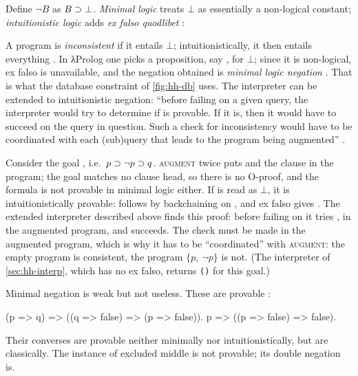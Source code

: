 {{Define $\neg B$ as $B\supset\bot$. \emph{Minimal logic} treats $\bot$ as essentially a non-logical constant;
\emph{intuitionistic logic} adds \emph{ex falso quodlibet} :
\begin{mathpar}
\end{mathpar}
A program is \emph{inconsistent} if it entails $\bot$; intuitionistically, it then entails everything
. In λProlog one picks a proposition, say , for $\bot$; since it is non-logical, ex falso
is unavailable, and the negation obtained is \emph{minimal logic negation} . That is what the
database constraint of \cref{fig:hh-db} uses. The interpreter can be extended to intuitionistic negation:
``before failing on a given query, the interpreter would try to determine if  is provable. If it
is, then it would have to succeed on the query in question. Such a check for inconsistency would have to be
coordinated with each (sub)query that leads to the program being augmented'' .

\begin{example}
Consider the goal , i.e.\ $p\supset\neg p\supset q$. \textsc{augment} twice puts
 and the clause  in the program; the goal  matches no clause head, so there is
no O-proof, and the formula is not provable in minimal logic either. If  is read as $\bot$, it is
intuitionistically provable:  follows by backchaining on , and ex falso gives
. The extended interpreter described above finds this proof: before failing on  it tries
, in the augmented program, and succeeds. The check must be made in the augmented program,
which is why it has to be ``coordinated'' with \textsc{augment}: the empty program is consistent, the
program $\{p,\ \neg p\}$ is not. (The interpreter of \cref{sec:hh-interp}, which has no ex falso, returns
\texttt{()} for this goal.)
\end{example}

Minimal negation is weak but not useless. These are provable :
\begin{lprolog}
(p => q) => ((q => false) => (p => false)).
p => ((p => false) => false).
\end{lprolog}
Their converses are provable neither minimally nor intuitionistically, but are classically. The instance of
excluded middle  is not provable; its double negation
 is.

}}
